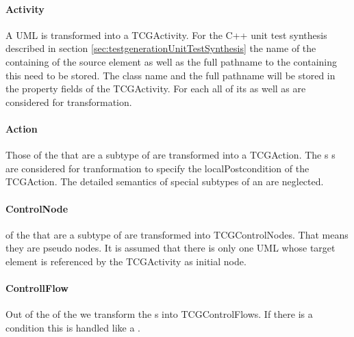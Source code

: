 \paragraph{Activity}
A UML  is transformed into a TCGActivity. For the C++ unit test synthesis described in section \ref{sec:testgenerationUnitTestSynthesis} the name of the containing  of the source element as well as the full pathname to the  containing this  need to be stored. The class name and the full pathname will be stored in the property fields of the TCGActivity. For each  all of its  as well as  are considered for transformation.
\paragraph{Action} Those  of the  that are a subtype of  are transformed into a TCGAction. The s s are considered for tranformation to specify the localPostcondition of the TCGAction. The detailed semantics of special subtypes of an  are neglected.
\paragraph{ControlNode}  of the  that are a subtype of  are transformed into TCGControlNodes. That means they are pseudo nodes. It is assumed that there is only one UML  whose target element is referenced by the TCGActivity as initial node.
\paragraph{ControllFlow} Out of the  of the  we transform the s into TCGControlFlows. If there is a  condition this is handled like a .
